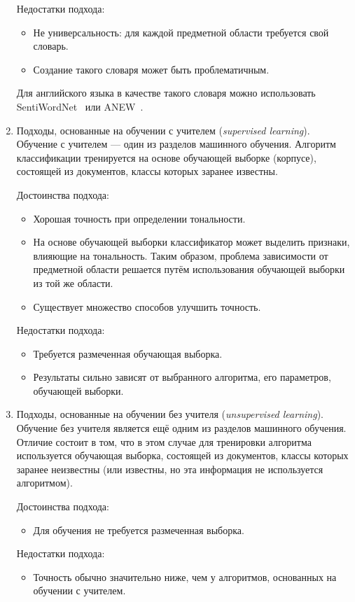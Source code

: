 \begin{enumerate}
{Недостатки подхода:
\begin{itemize}
\item { Не универсальность: для каждой предметной области требуется свой словарь. }
\item {  Создание такого словаря может быть проблематичным.  }
\end{itemize} 

  Для английского языка в качестве такого словаря можно использовать SentiWordNet~\cite{sentiwordnet} или ANEW~\cite{anew}.
}

\item {
  Подходы, основанные на обучении с учителем (\textit{supervised learning}). 
  Обучение с учителем --- один из разделов машинного обучения. Алгоритм классификации тренируется на основе обучающей выборке (корпусе), состоящей из документов, классы которых заранее известны. 

Достоинства подхода:
\begin{itemize}
\item {  Хорошая точность при определении тональности. }
\item {  На основе обучающей выборки классификатор может выделить 
признаки, влияющие на тональность. Таким образом, проблема зависимости от предметной области решается путём использования обучающей выборки из той же области. }
\item {  Существует множество способов улучшить точность. }
\end{itemize}

Недостатки подхода:
\begin{itemize}
\item {  Требуется размеченная обучающая выборка.  }
\item {  Результаты сильно зависят от выбранного алгоритма, его параметров, обучающей выборки. }
\end{itemize} 

}

\item {
  Подходы, основанные на обучении без учителя (\textit{unsupervised learning}). 
  Обучение без учителя является ещё одним из разделов машинного обучения. Отличие состоит в том, что в этом случае для тренировки алгоритма используется обучающая выборка, состоящей из документов, классы которых заранее неизвестны (или известны, но эта информация не используется алгоритмом).

Достоинства подхода:
\begin{itemize}
\item {  Для обучения не требуется размеченная выборка. }
\end{itemize}

Недостатки подхода:
\begin{itemize}
\item {  Точность обычно значительно ниже, чем у алгоритмов, основанных на обучении с учителем.  }
\end{itemize} 

}

\end{enumerate}

